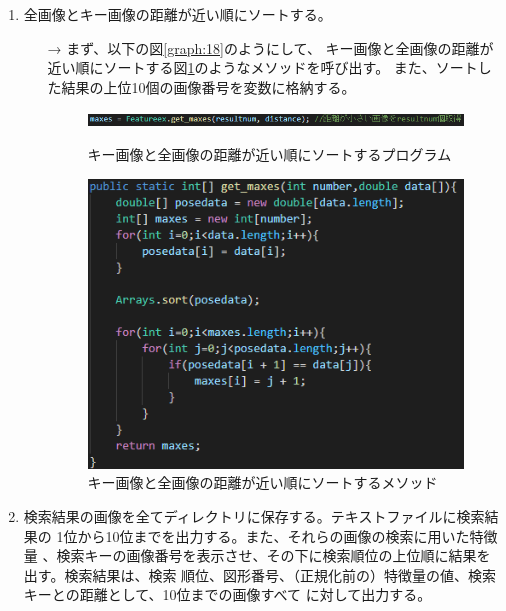 \begin{enumerate}
  \item 全画像とキー画像の距離が近い順にソートする。
  \begin{itemize}
    \item[→] まず、以下の図\ref{graph:18}のようにして、
    キー画像と全画像の距離が近い順にソートする図\ref{graph:19}のようなメソッドを呼び出す。
    また、ソートした結果の上位10個の画像番号を変数に格納する。
    \begin{figure}[htbp]
      \begin{minipage}[t]{0.45\hsize}
        \includegraphics[scale=0.5]{昇順.PNG}
        \centering
        \caption{キー画像と全画像の距離が近い順にソートするプログラム}
        \label{graph:18}
      \end{minipage}
      \begin{minipage}[t]{0.45\hsize}
        \includegraphics[scale=0.5]{昇順2.PNG}
        \centering
        \caption{キー画像と全画像の距離が近い順にソートするメソッド}
        \label{graph:19}
      \end{minipage}
    \end{figure}
  \end{itemize}
\clearpage
  \item 検索結果の画像を全てディレクトリに保存する。テキストファイルに検索結果の
  1位から10位までを出力する。また、それらの画像の検索に用いた特徴量
  、検索キーの画像番号を表示させ、その下に検索順位の上位順に結果を出す。検索結果は、検索
  順位、図形番号、（正規化前の）特徴量の値、検索キーとの距離として、10位までの画像すべて
  に対して出力する。


\end{enumerate}
